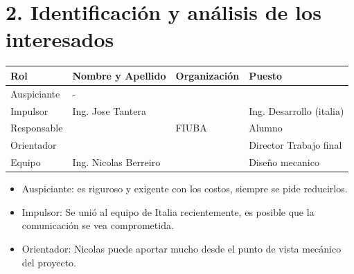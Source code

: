 \documentclass[
11pt, %
codirector, %
]{charter}
\begin{document}
\vspace{25px}

\section{2. Identificación y análisis de los interesados}
\label{sec:interesados}


\begin{table}[ht]
	\begin{tabularx}{\linewidth}{@{}|l|X|X|l|@{}}
		\hline
		\rowcolor[HTML]{C0C0C0}
		Rol         & Nombre y Apellido     & Organización    & Puesto                   \\ \hline
		Auspiciante & -                     & \empclientename &                          \\ \hline
		Impulsor    & Ing. Jose Tantera     & \empclientename & Ing. Desarrollo (italia) \\ \hline
		Responsable & \authorname           & FIUBA           & Alumno                   \\ \hline
		Orientador  & \supname              & \empclientename & Director Trabajo final   \\ \hline
		Equipo      & Ing. Nicolas Berreiro & \empclientename & Diseño mecanico          \\ \hline
	\end{tabularx}
\end{table}

\begin{itemize}
	\item Auspiciante: es riguroso y exigente con los costos, siempre se pide reducirlos.
	\item Impulsor: Se unió al equipo de Italia recientemente, es posible que la comunicación se vea comprometida.
	\item Orientador: Nicolas puede aportar mucho desde el punto de vista mecánico del proyecto.
\end{itemize}
\end{document}
